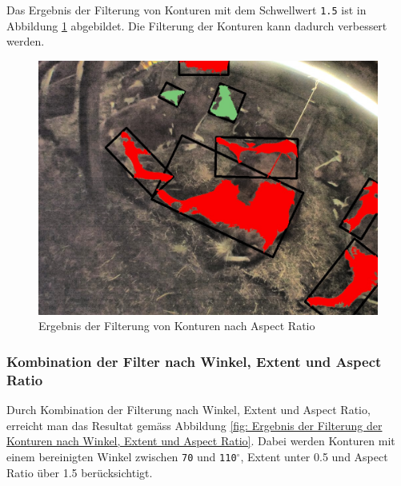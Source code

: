 Das Ergebnis der Filterung von Konturen mit dem Schwellwert \texttt{1.5} ist in Abbildung \ref{fig: Ergebnis der Filterung von Konturen nach Aspect Ratio} abgebildet. Die Filterung der Konturen kann dadurch verbessert werden.
\begin{figure}[H]
	\center
	\includegraphics[scale=0.43]{Grafiken/entwicklung/27AspectRatio.jpg}
	\caption{Ergebnis der Filterung von Konturen nach Aspect Ratio } 
	\label{fig: Ergebnis der Filterung von Konturen nach Aspect Ratio} 
\end{figure}
\subsubsection{Kombination der Filter nach Winkel, Extent und Aspect Ratio }
Durch Kombination der Filterung nach Winkel, Extent und Aspect Ratio, erreicht man das Resultat gemäss Abbildung \ref{fig: Ergebnis der Filterung der Konturen nach Winkel, Extent und Aspect Ratio}. Dabei werden Konturen mit einem bereinigten Winkel zwischen \texttt{70} und \texttt{110}$^{\circ}$, Extent unter 0.5 und Aspect Ratio über 1.5 berücksichtigt.



